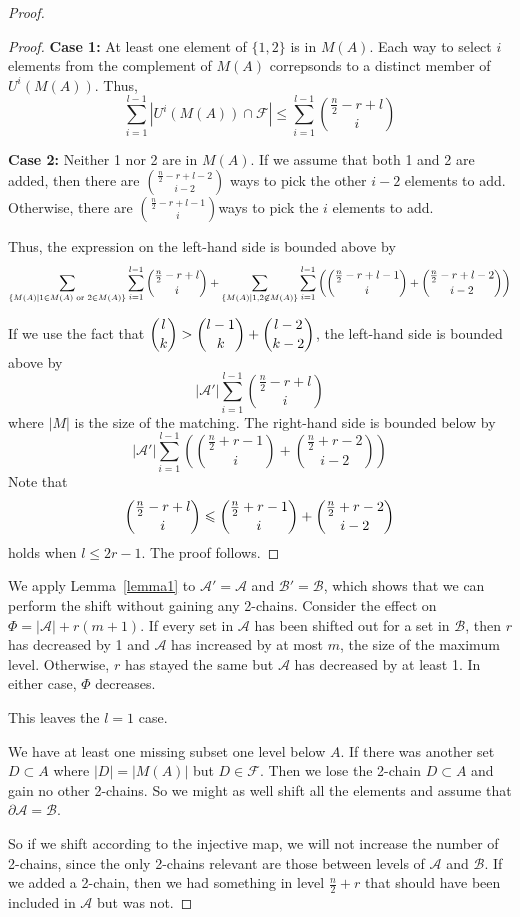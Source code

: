 \documentclass[12pt]{article}
\theoremstyle{plain}
\theoremstyle{definition}
\theoremstyle{remark}
\newcommand{\F}{\mathcal{F}}
\newcommand{\A}{\mathcal{A}}
\newcommand{\B}{\mathcal{B}}
\begin{document}
\begin{proof}
\begin{proof}
\textbf{Case 1:} At least one element of $\{1,2\}$ is in $M(A)$. Each way to select $i$ elements from the complement of $M(A)$ correpsonds to a distinct member of $U^i(M(A))$. Thus,
\[ \sum_{i = 1}^{l-1} |U^i(M(A)) \cap \F| \leq \sum_{i=1}^{l-1}\binom{\frac{n}{2}-r+l}{i}\]

\textbf{Case 2:} Neither 1 nor 2 are in $M(A)$. If we assume that both 1 and 2 are added, then there are $\binom{\frac{n}{2}-r + l - 2}{i -2}$ ways to pick the other $i - 2$ elements to add. Otherwise, there are $\binom{\frac{n}{2} - r + l - 1}{i}$ways to pick the $i$ elements to add.

Thus, the expression on the left-hand side is bounded above by
\[ \sum_{\{M(A) | 1 \in M(A) \text{ or } 2 \in M(A)\}} \sum_{i=1}^{l-1} \dbinom{\frac{n}{2}-r+l}{i} + \sum_{\{M(A) | 1, 2 \not\in M(A)\}} \sum_{i=1}^{l-1} \left( \dbinom{\frac{n}{2}-r+l-1}{i} + \dbinom{\frac{n}{2}-r+l-2}{i-2} \right) \]

If we use the fact that $\dbinom{l}{k} > \dbinom{l-1}{k} + \dbinom{l-2}{k-2}$, the left-hand side is bounded above by
\[ |\A'|\sum_{i=1}^{l-1} \binom{\frac{n}{2}-r+l}{i}\]
where $|M|$ is the size of the matching.
The right-hand side is bounded below by
\[ |\A'| \sum_{i=1}^{l-1}\left(\binom{\frac{n}{2} + r - 1}{i} + \binom{\frac{n}{2}+r-2}{i-2}\right)\]
Note that
\[ \dbinom{\frac{n}{2}-r+l}{i} \leq \dbinom{\frac{n}{2}+r-1}{i} + \dbinom{\frac{n}{2}+r-2}{i-2} \]
holds when $l \leq 2r-1$. The proof follows.
\end{proof}

We apply Lemma~\ref{lemma1} to $\A' = \A$ and $\B' = \B$, which shows that we can perform the shift without gaining any 2-chains. Consider the effect on $\Phi = |\A| + r(m+1)$. If every set in $\A$ has been shifted out for a set in $\B$, then $r$ has decreased by 1 and $\A$ has increased by at most $m$, the size of the maximum level. Otherwise, $r$ has stayed the same but $\A$ has decreased by at least 1. In either case, $\Phi$ decreases.

This leaves the $l = 1$ case. 

We have at least one missing subset one level below $A$. If there was another set $D \subset A$ where $|D| = |M(A)|$ but $D \in \F$. Then we lose the 2-chain $D \subset A$ and gain no other 2-chains. So we might as well shift all the elements and assume that $\partial \A = \B$. 

So if we shift according to the injective map, we will not increase the number of 2-chains, since the only 2-chains relevant are those between levels of $\A$ and $\B$. If we added a 2-chain, then we had something in level $\frac{n}{2} + r$ that should have been included in $\A$ but was not.


\end{proof}
\end{document}
